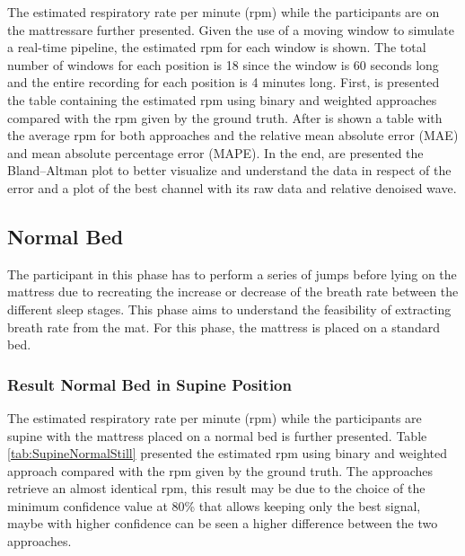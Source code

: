 The estimated respiratory rate per minute (rpm) while the participants are on the mattressare further presented. Given the use of a moving window to simulate a real-time pipeline, the estimated rpm for each window is shown. 
The total number of windows for each position is 18 since the window is 60 seconds long and the entire recording for each position is 4 minutes long. 
First, is presented the table containing the estimated rpm using binary and weighted approaches compared with the rpm given by the ground truth. 
After is shown a table with the average rpm for both approaches and the relative mean absolute error (MAE) and mean absolute percentage error (MAPE). In the end, are presented the Bland–Altman plot to better visualize and understand the data in respect of the error and a plot of the best channel with its raw data and relative denoised wave.


\subsection{Normal Bed}

The participant in this phase has to perform a series of jumps before lying on the mattress due to recreating the increase or decrease of the breath rate between the different sleep stages. This phase aims to understand the feasibility of extracting breath rate from the mat. For this phase, the mattress is placed on a standard bed.


\subsubsection{Result Normal Bed in Supine Position}   \label{cap:ResultNormalBed1}

The estimated respiratory rate per minute (rpm) while the participants are supine with the mattress placed on a normal bed is further presented. Table \ref{tab:SupineNormalStill} presented the estimated rpm using binary and weighted approach compared with the rpm given by the ground truth. The approaches retrieve an almost identical rpm, this result may be due to the choice of the minimum confidence value at 80\% that allows keeping only the best signal, maybe with higher confidence can be seen a higher difference between the two approaches. 

\vspace{0.5cm}



